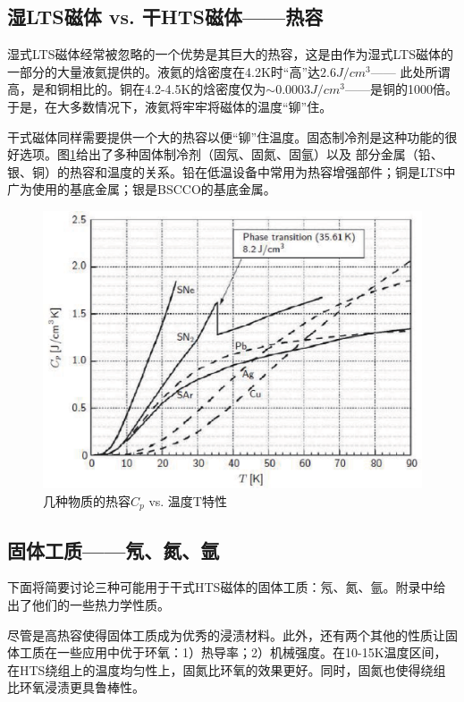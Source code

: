 \subsection{湿LTS磁体 vs. 干HTS磁体——热容}
湿式LTS磁体经常被忽略的一个优势是其巨大的热容，这是由作为湿式LTS磁体的一部分的大量液氦提供的。液氦的焓密度在4.2K时“高”达$2.6 J/cm^3$——
此处所谓高，是和铜相比的。铜在4.2-4.5K的焓密度仅为$\sim 0.0003J/cm^3$——是铜的1000倍。于是，在大多数情况下，液氦将牢牢将磁体的温度“铆”住。

干式磁体同样需要提供一个大的热容以便“铆”住温度。固态制冷剂是这种功能的很好选项。图\ref{fig:heatcap}给出了多种固体制冷剂（固氖、固氮、固氩）以及
部分金属（铅、银、铜）的热容和温度的关系。铅在低温设备中常用为热容增强部件；铜是LTS中广为使用的基底金属；银是BSCCO的基底金属。
\begin{figure}
  \centering
 \includegraphics[scale=0.7]{chpt4/figs/fig4.2.eps}
  \caption{几种物质的热容$C_p$ vs. 温度T特性}\label{fig:heatcap}
\end{figure}

\subsection{固体工质——氖、氮、氩}
下面将简要讨论三种可能用于干式HTS磁体的固体工质：氖、氮、氩。附录中给出了他们的一些热力学性质。

尽管是高热容使得固体工质成为优秀的浸渍材料。此外，还有两个其他的性质让固体工质在一些应用中优于环氧：1）热导率；2）机械强度。在10-15K温度区间，
在HTS绕组上的温度均匀性上，固氮比环氧的效果更好。同时，固氮也使得绕组比环氧浸渍更具鲁棒性。


